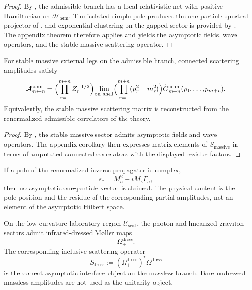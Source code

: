 \begin{proof}
By , the admissible branch
has a local relativistic net with positive Hamiltonian on $\mathcal H_{\mathrm{adm}}$. The isolated
simple pole produces the one-particle spectral projector of
, and exponential clustering on the gapped sector is
provided by . The appendix theorem
 therefore applies and yields the asymptotic fields, wave
operators, and the stable massive scattering operator.
\end{proof}

\begin{theorem}
\label{thm:lsz-stable-massive}
For stable massive external legs on the admissible branch, connected scattering amplitudes satisfy
\[
\mathcal A_{m\leftarrow n}^{\mathrm{conn}}
=
\Bigl(\prod_{r=1}^{m+n} Z_r^{-1/2}\Bigr)
\lim_{\mathrm{on\ shell}}
\Bigl(\prod_{r=1}^{m+n}(p_r^2+m_r^2)\Bigr)
\widetilde G_{m+n}^{\mathrm{conn}}(p_1,\ldots,p_{m+n}).
\]
Equivalently, the stable massive scattering matrix is reconstructed from the renormalized
admissible correlators of the theory.
\end{theorem}

\begin{proof}
By , the stable massive sector admits asymptotic fields and wave
operators. The appendix corollary  then expresses matrix elements
of $S_{\mathrm{massive}}$ in terms of amputated connected correlators with the displayed residue
factors.
\end{proof}

\begin{remark}
\label{rem:resonant-states-admissible}
If a pole of the renormalized inverse propagator is complex,
\[
s_\ast=M_a^2-iM_a\Gamma_a,
\]
then no asymptotic one-particle vector is claimed. The physical content is the pole position and
the residue of the corresponding partial amplitudes, not an element of the asymptotic Hilbert
space.
\end{remark}

\begin{theorem}
\label{thm:dressed-massless-interface}
\label{rem:ir-dressed-massless-sectors}
On the low-curvature laboratory region $\mathcal U_{\mathrm{scat}}$, the photon and linearized
graviton sectors admit infrared-dressed M\o ller maps
\[
\Omega_\pm^{\mathrm{dress}}.
\]
The corresponding inclusive scattering operator
\[
S_{\mathrm{dress}}:=(\Omega_+^{\mathrm{dress}})^\ast \Omega_-^{\mathrm{dress}}
\]
is the correct asymptotic interface object on the massless branch. Bare undressed massless
amplitudes are not used as the unitarity object.
\end{theorem}

